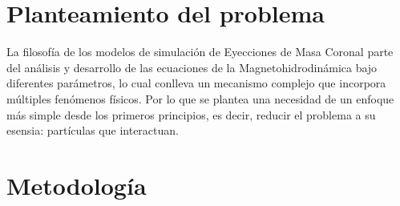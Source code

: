 \section{Planteamiento del problema}
La filosofía de los modelos de simulación de Eyecciones de Masa Coronal parte del análisis y desarrollo de las ecuaciones de la Magnetohidrodinámica bajo diferentes parámetros, lo cual conlleva un mecanismo complejo que incorpora múltiples fenómenos físicos. Por lo que se plantea una necesidad de un enfoque más simple desde los primeros principios, es decir, reducir el problema a su esensia: partículas que interactuan. 


\section{Metodología}
\printbibliography
